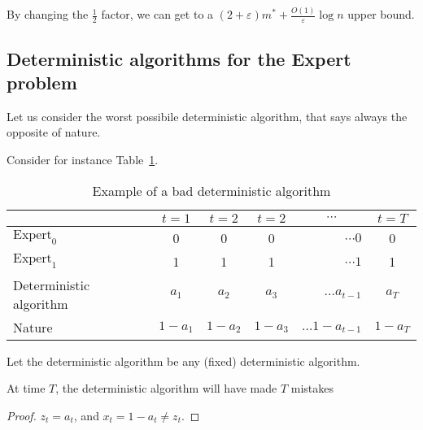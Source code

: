     By changing the $\frac{1}{2}$ factor, we can get to a $(2 + \varepsilon)m^* + \frac{O(1)}{\varepsilon} \log n$ upper bound.


\subsection{Deterministic algorithms for the Expert problem}
    Let us consider the worst possibile deterministic algorithm, that says always the opposite of nature.

    Consider for instance Table~\ref{table:expert_example}.

    \begin{table}[h]
        \begin{tabular}{|l|c|c|c|r|c|}
        \hline
                                & $t=1$                          & $t=2$                          & $t=2$                          & \multicolumn{1}{c|}{$\cdots$} & $t = T$   \\ \hline
        $\text{Expert}_0$       & 0                              & 0                              & 0                              & $\cdots 0$                    & 0         \\ \hline
        $\text{Expert}_1$       & 1                              & 1                              & 1                              & $\cdots 1$                    & 1         \\ \hline
        Deterministic algorithm & $a_1$                          & $a_2$                          & $a_3$                          & $\dots a_{t-1}$               & $a_T$     \\ \hline
        Nature                  & \multicolumn{1}{l|}{$1 - a_1$} & \multicolumn{1}{l|}{$1 - a_2$} & \multicolumn{1}{l|}{$1 - a_3$} & $\dots 1 - a_{t-1}$           & $1 - a_T$ \\ \hline
        \end{tabular}
        \caption{Example of a bad deterministic algorithm}
        \label{table:expert_example}
    \end{table}

    Let the deterministic algorithm be any (fixed) deterministic algorithm.

    \begin{claim}
        At time $T$, the deterministic algorithm will have made $T$ mistakes
    \end{claim}

    \begin{proof}
        $z_t = a_t$, and $x_t = 1 - a_t \neq z_t$.    
    \end{proof}

